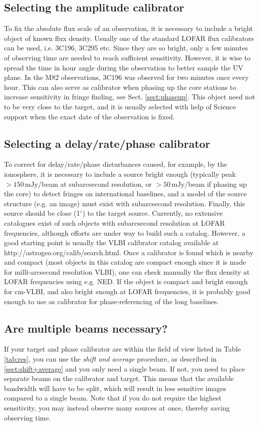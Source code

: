 \subsection{Selecting the amplitude calibrator}
To fix the absolute flux scale of an observation, it is necessary to include a
bright object of known flux density.  Usually one of the standard LOFAR flux
calibrators can be used, i.e. 3C196, 3C295 etc. Since they are so bright, only
a few minutes of observing time are needed to reach sufficient sensitivity.
However, it is wise to spread the time in hour angle during the observation to
better sample the UV plane. In the M82 observations, 3C196 was observed for two
minutes once every hour.  This can also serve as calibrator when phasing up the
core stations to increase sensitivity in fringe finding, see Sect.
\ref{sect:phaseup}. This object need not to be very close to the target, and it
is usually selected with help of Science support when the exact date of the
observation is fixed.

\subsection{Selecting a delay/rate/phase calibrator}
To correct for delay/rate/phase disturbances caused, for example, by the
ionosphere, it is necessary to include a source bright enough (typically peak
$>150$\,mJy/beam at subarcsecond resolution, or $>50$\,mJy/beam if phasing up
the core) to detect fringes on international baselines, and a model of the
source structure (e.g. an image) must exist with subarcsecond resolution.
Finally, this source should be close (1$^\circ$) to the target source.
Currently, no extensive catalogues exist of such objects with subarcsecond
resolution at LOFAR frequencies, although efforts are under way to 
build such a catalog. However, a good starting point is usually
the VLBI calibrator catalog available at http://astrogeo.org/calib/search.html.
Once a calibrator is found which is nearby and compact (most objects in this 
catalog are compact enough since it is made for milli-arcsecond resolution VLBI),
one can check manually the flux density at LOFAR frequencies using e.g. NED. 
If the object is compact and bright enough for cm-VLBI, and also bright
enough at LOFAR frequencies, it is probably good enough to use as calibrator
for phase-referencing of the long baselines.

\subsection{Are multiple beams necessary?}
If your target and phase calibrator are within the field of view listed in
Table \ref{tab:res}, you can use the \emph{shift and average} procedure, as
described in \ref{sect:shift+average} and you only need a single beam.  If not,
you need to place separate beams on the calibrator and target. This means that
the available bandwidth will have to be split, which will result in less
sensitive images compared to a single beam. Note that if you do not require the
highest sensitivity, you may instead observe many sources at once, thereby
saving observing time. 

